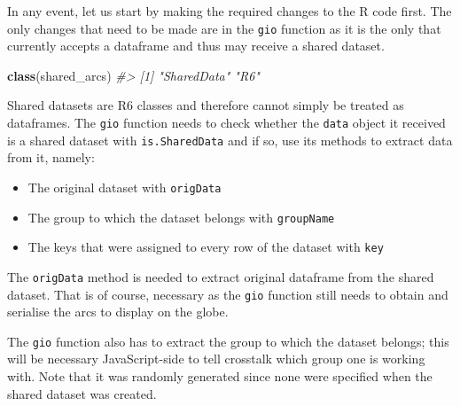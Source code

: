 \documentclass[10pt,]{krantz}
\makeatletter
\newenvironment{Shaded}{\begin{snugshade}}{\end{snugshade}}
\newcommand{\CommentTok}[1]{\textcolor[rgb]{0.37,0.37,0.37}{\textit{#1}}}
\newcommand{\KeywordTok}[1]{\textcolor[rgb]{0.27,0.27,0.27}{\textbf{#1}}}
\newcommand{\NormalTok}[1]{#1}
\newcommand{\OperatorTok}[1]{\textcolor[rgb]{0.43,0.43,0.43}{\textbf{#1}}}
\providecommand{\tightlist}{%
  \setlength{\itemsep}{0pt}\setlength{\parskip}{0pt}}
\newenvironment{kframe}{%
\medskip{}
\setlength{\fboxsep}{.8em}
 \def\at@end@of@kframe{}%
 \ifinner\ifhmode%
  \def\at@end@of@kframe{\end{minipage}}%
  \begin{minipage}{\columnwidth}%
 \fi\fi%
 \def\FrameCommand##1{\hskip\@totalleftmargin \hskip-\fboxsep
 \colorbox{shadecolor}{##1}\hskip-\fboxsep
     \hskip-\linewidth \hskip-\@totalleftmargin \hskip\columnwidth}%
 \MakeFramed {\advance\hsize-\width
   \@totalleftmargin\z@ \linewidth\hsize
   \@setminipage}}%
 {\par\unskip\endMakeFramed%
 \at@end@of@kframe}
\renewenvironment{Shaded}{\begin{kframe}}{\end{kframe}}
\makeatother
\begin{document}
In any event, let us start by making the required changes to the R code first. The only changes that need to be made are in the \texttt{gio} function as it is the only that currently accepts a dataframe and thus may receive a shared dataset.

\begin{Shaded}
\begin{Highlighting}[]
\KeywordTok{class}\NormalTok{(shared_arcs)}
\CommentTok{#> [1] "SharedData" "R6"}
\end{Highlighting}
\end{Shaded}

Shared datasets are R6 classes and therefore cannot simply be treated as dataframes. The \texttt{gio} function needs to check whether the \texttt{data} object it received is a shared dataset with \texttt{is.SharedData} and if so, use its methods to extract data from it, namely:

\begin{itemize}
\tightlist
\item
  The original dataset with \texttt{origData}
\item
  The group to which the dataset belongs with \texttt{groupName}
\item
  The keys that were assigned to every row of the dataset with \texttt{key}
\end{itemize}

The \texttt{origData} method is needed to extract original dataframe from the shared dataset. That is of course, necessary as the \texttt{gio} function still needs to obtain and serialise the arcs to display on the globe.

\begin{Shaded}
\end{Shaded}

The \texttt{gio} function also has to extract the group to which the dataset belongs; this will be necessary JavaScript-side to tell crosstalk which group one is working with. Note that it was randomly generated since none were specified when the shared dataset was created.

\begin{Shaded}
\end{Shaded}
\end{document}
